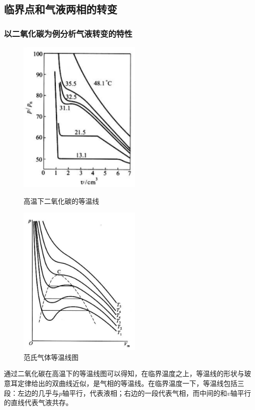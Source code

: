\documentclass[UTF8]{ctexart}
\begin{document}
	\subsection{临界点和气液两相的转变}
	\subsubsection{以二氧化碳为例分析气液转变的特性}
	\begin{figure}[ht]
		\begin{minipage}[t]{0.5 \linewidth}
			\centering
			\includegraphics[width=6cm]{Ther_CO2.png}
			\caption{高温下二氧化碳的等温线}
			\label{figure_3}
		\end{minipage}
		\begin{minipage}[t]{0.5 \linewidth}
			\centering
			\includegraphics[width=6cm]{Ther_fangde.png}
			\caption{范氏气体等温线图}
			\label{figure_4}
		\end{minipage}
	\end{figure}

	通过二氧化碳在高温下的等温线图可以得知，在临界温度之上，等温线的形状与玻意耳定律给出的双曲线近似，是气相的等温线。在临界温度一下，等温线包括三段：左边的几乎与$ p $轴平行，代表液相；右边的一段代表气相，而中间的和$ v $轴平行的直线代表气液共存。
	
\end{document}
